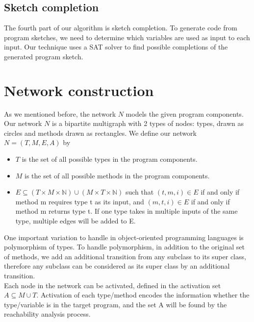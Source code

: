 \documentclass[twocolumn]{article}
\begin{document}
\subsection{Sketch completion}
The fourth part of our algorithm is sketch completion. To generate code from program sketches, we need to determine which variables are used as input to each input. Our technique uses a SAT solver to find possible completions of the generated program sketch.\\

\section{Network construction}
As we mentioned before, the network $N$ models the given program components. Our network $N$ is a bipartite multigraph with 2 types of nodes: types, drawn as circles and methods drawn as rectangles. We define our network $N = (T,M,E,A)$ by
\begin{itemize}
    \item $T$ is the set of all possible types in the program components.
    \item $M$ is the set of all possible methods in the program components.
    \item $E \subseteq (T\times M \times \mathbb{N})\cup(M\times T \times \mathbb{N})$ such that $(t,m,i) \in E$ if and only if method m requires type t as its input, and $(m,t,i) \in E$ if and only if method m returns type t. If one type takes in multiple inputs of the same type, multiple edges will be added to E.\\
\end{itemize}

One important variation to handle in object-oriented programming languages is polymorphism of types. To handle polymorphism, in addition to the original set of methods, we add an additional transition from any subclass to its super class, therefore any subclass can be considered as its super class by an additional transition.\\

Each node in the network can be activated, defined in the activation set $A \subseteq M\cup T$. Activation of each type/method encodes the information whether the type/variable is in the target program, and the set A will be found by the reachability analysis process.
\end{document}
